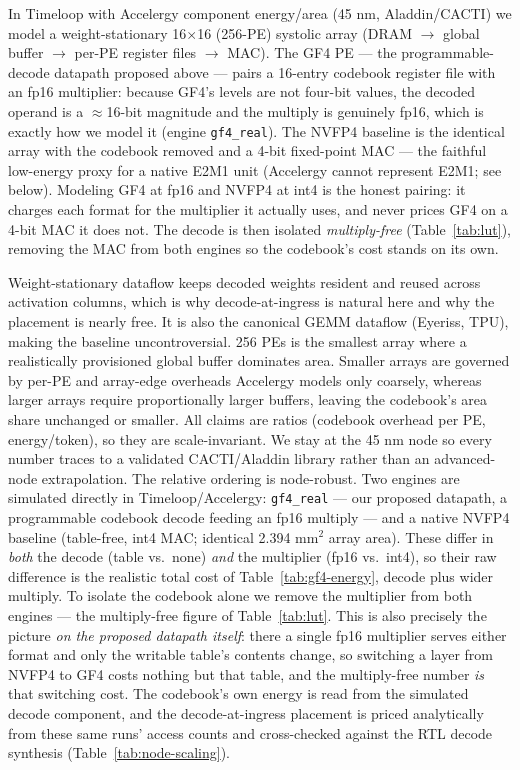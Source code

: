 In Timeloop with Accelergy component energy/area (45 nm, Aladdin/CACTI) we model
a weight-stationary 16$\times$16 (256-PE) systolic array (DRAM $\rightarrow$
global buffer $\rightarrow$ per-PE register files $\rightarrow$ MAC). The GF4 PE
--- the programmable-decode datapath proposed above --- pairs a 16-entry codebook
register file with an fp16 multiplier: because GF4's levels are not four-bit
values, the decoded operand is a $\approx$16-bit magnitude and the multiply is
genuinely fp16, which is exactly how we model it (engine \texttt{gf4\_real}). The NVFP4 baseline is the identical array with the
codebook removed and a 4-bit fixed-point MAC --- the faithful low-energy proxy
for a native E2M1 unit (Accelergy cannot represent E2M1; see below). Modeling
GF4 at fp16 and NVFP4 at int4 is the honest pairing: it charges each format for
the multiplier it actually uses, and never prices GF4 on a 4-bit MAC it does not.
The decode is then isolated \emph{multiply-free} (Table~\ref{tab:lut}), removing
the MAC from both engines so the codebook's cost stands on its own.

Weight-stationary dataflow keeps decoded weights resident and reused across
activation columns, which is why decode-at-ingress is natural here and why the
placement is nearly free. It is also the canonical GEMM dataflow (Eyeriss, TPU),
making the baseline uncontroversial. 256 PEs is the smallest array where a
realistically provisioned global buffer dominates area. Smaller arrays are
governed by per-PE and array-edge overheads Accelergy models only coarsely,
whereas larger arrays require proportionally larger buffers, leaving the
codebook's area share unchanged or smaller. All claims are ratios (codebook
overhead per PE, energy/token), so they are scale-invariant. We stay at the
45 nm node so every number traces to a validated CACTI/Aladdin library rather
than an advanced-node extrapolation. The relative ordering is node-robust.
Two engines are simulated directly in Timeloop/Accelergy: \texttt{gf4\_real} ---
our proposed datapath, a programmable codebook decode feeding an fp16 multiply ---
and a native NVFP4 baseline (table-free, int4 MAC; identical 2.394 mm$^2$ array
area). These differ in \emph{both} the decode (table vs.\ none) \emph{and} the
multiplier (fp16 vs.\ int4), so their raw difference is the realistic total cost
of Table~\ref{tab:gf4-energy}, decode plus wider multiply. To isolate the codebook
alone we remove the multiplier from both engines --- the multiply-free figure of
Table~\ref{tab:lut}. This is also precisely the picture \emph{on the proposed
datapath itself}: there a single fp16 multiplier serves either format and only the
writable table's contents change, so switching a layer from NVFP4 to GF4 costs
nothing but that table, and the multiply-free number \emph{is} that switching cost.
The codebook's own energy is read from the simulated decode component, and the
decode-at-ingress placement is priced analytically from these same runs' access
counts and cross-checked against the RTL decode synthesis
(Table~\ref{tab:node-scaling}).

